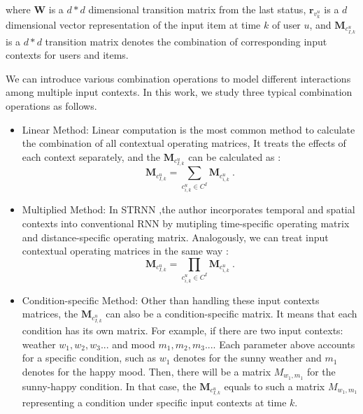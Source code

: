 \documentclass[conference]{IEEEtran}
\begin{document}
where  $\textbf{W}$ is a $d*d$ dimensional transition matrix from the last status, $\textbf{r}_{v_{k}^{u}}$ is a  $d$ dimensional vector representation of the input item at time $k$ of user $u$, and $\textbf{M}_{c_{I,k}^{u}}$ is a  $d*d$ transition matrix denotes the combination of corresponding input contexts for users and items.  

We can introduce various combination operations to model different interactions among multiple input contexts. In this work, we study three typical combination operations as follows.

\begin{itemize}
\item Linear Method: Linear computation is the most common method to calculate the combination of all contextual operating matrices, It treats the effects of each context separately, and the $\textbf{M}_{c_{I,k}^{u}}$ can be calculated as :
\begin{equation} \label{eqMadd}
\textbf{M}_{c_{I,k}^{u}} = \sum_{c_{i,k}^{u}\in C^I} \textbf{M}_{c_{i,k}^{u}} ~.
\end{equation}

\item Multiplied Method: In STRNN  \cite{liu2016strnn} ,the author incorporates temporal and spatial contexts into conventional RNN by mutipling time-specific operating matrix and distance-specific operating matrix. Analogously, we can treat input contextual operating matrices in the same way :
\begin{equation}
\textbf{M}_{c_{I,k}^{u}} = \prod_{c_{i,k}^{u}\in C^I} \textbf{M}_{c_{i,k}^{u}} ~.
\end{equation}

\item Condition-specific Method: Other than handling these input contexts matrices, the $\textbf{M}_{c_{I,k}^{u}}$ can also be a condition-specific matrix. It means that each condition has its own matrix. For example, if there are two input contexts: weather ${w_1,w_2,w_3...}$ and mood ${m_1,m_2,m_3...}$. Each parameter above accounts for a specific condition, such as $w_1$ denotes for the sunny weather and $m_1$ denotes for the happy mood. Then, there will be a matrix $M_{w_1,m_1}$ for the sunny-happy condition. In that case, the $\textbf{M}_{c_{I,k}^{u}}$ equals to such a matrix $M_{w_1,m_1}$ representing a condition under specific input contexts at time $k$. 

\end{itemize}
\end{document}
